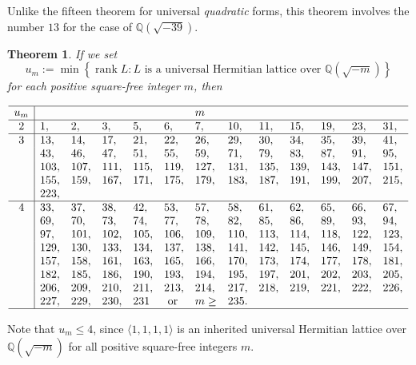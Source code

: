 \documentclass[a4paper,10pt,reqno]{amsart}
\newtheorem{Thm}{Theorem}
\begin{document}
Unlike the fifteen theorem for universal \emph{quadratic} forms, this theorem involves the number
$13$ for the case of ${\mathbb{Q}(\sqrt{{-39}})}$.

\begin{Thm}
If we set
\[
    u_{m} := \min\left\{ {\operatorname{rank}}{L}: L \text{ is a universal Hermitian lattice over }{\mathbb{Q}(\sqrt{{-m}})} \right\}
\]
for each positive square-free integer $m$, then

\[
\begin{array}{c|llllllllllll}  \hline u_{m} &       &     &      &      &      & m    &      &      &      &      &      &       \\
\hline
  2   & 1,    & 2,  & 3,   & 5,   & 6,   & 7,   & 10,  & 11,  & 15,  & 19,  & 23,  & 31,   \\
\hline
  3   & 13,   & 14, & 17,  & 21,  & 22,  & 26,  & 29,  & 30,  & 34,  & 35,  & 39,  & 41,  \\
      & 43,   & 46, & 47,  & 51,  & 55,  & 59,  & 71,  & 79,  & 83,  & 87,  & 91,  & 95,  \\
      & 103,  & 107,& 111, & 115, & 119, & 127, & 131, & 135, & 139, & 143, & 147, & 151, \\
      & 155,  & 159,& 167, & 171, & 175, & 179, & 183, & 187, & 191, & 199, & 207, & 215, \\
      & 223,  \\
\hline
  4   & 33,   & 37,  & 38,  & 42,  & 53,  & 57,  & 58,   & 61,  & 62,  & 65,  & 66,  & 67,  \\
      & 69,   & 70,  & 73,  & 74,  & 77,  & 78,  & 82,   & 85,  & 86,  & 89,  & 93,  & 94,  \\
      & 97,   & 101, & 102, & 105, & 106, & 109, & 110,  & 113, & 114, & 118, & 122, & 123, \\
      & 129, & 130, & 133, & 134, & 137, & 138,  & 141,  & 142, & 145, & 146, & 149, & 154, \\
      & 157, & 158, & 161, & 163, & 165, & 166,  & 170,  & 173, & 174, & 177, & 178, & 181, \\
      & 182, & 185, & 186, & 190, & 193, & 194,  & 195,  & 197, & 201, & 202, & 203, & 205, \\
      & 206, & 209, & 210, & 211, & 213, & 214,  & 217,  & 218, & 219, & 221, & 222, & 226, \\
      & 227, & 229, & 230, & 231  & \text { or } &m \ge &235.      \\ \hline
\end{array}
\]

\end{Thm}
Note that $u_{m} \leq 4$, since ${\langle {1,1,1,1} \rangle}$ is an inherited universal Hermitian lattice over
${\mathbb{Q}(\sqrt{{-m}})}$ for all positive square-free integers $m$.
\end{document}
